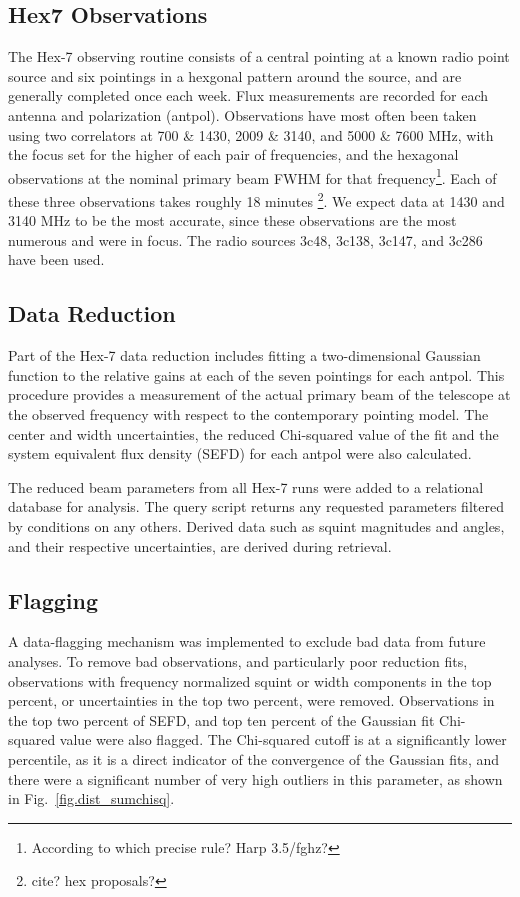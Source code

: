 \documentclass[preprint]{aastex}
\begin{document}
\subsection{Hex7 Observations}\label{ss.observations}
The Hex-7 observing routine consists of a central pointing at a known
radio point source and six pointings in a hexgonal pattern around the
source, and are generally completed once each week.  Flux measurements
are recorded for each antenna and polarization (antpol). Observations
have most often been taken using two correlators at 700 \& 1430, 2009
\& 3140, and 5000 \& 7600 MHz, with the focus set for the higher of
each pair of frequencies, and the hexagonal observations at the
nominal primary beam FWHM for that frequency\footnote{According to
  which precise rule?  Harp 3.5/fghz?}.  Each of these three
observations takes roughly 18 minutes \footnote{cite? hex
  proposals?}. We expect data at 1430 and 3140 MHz to be the most
accurate, since these observations are the most numerous and were in
focus. The radio sources 3c48, 3c138, 3c147, and 3c286 have been used.

\subsection{Data Reduction}\label{ss.reduction}
Part of the Hex-7 data reduction includes fitting a two-dimensional
Gaussian function to the relative gains at each of the seven pointings
for each antpol.  This procedure provides a measurement of the actual
primary beam of the telescope at the observed frequency with respect
to the contemporary pointing model.  The center and width
uncertainties, the reduced Chi-squared value of the fit and the system
equivalent flux density (SEFD) for each antpol were also calculated.

The reduced beam parameters from all Hex-7 runs were added to a
relational database for analysis.  The query script returns any
requested parameters filtered by conditions on any others.  Derived
data such as squint magnitudes and angles, and their respective
uncertainties, are derived during retrieval.

\subsection{Flagging}\label{ss.flagging}
A data-flagging mechanism was implemented to exclude bad data from
future analyses.  To remove bad observations, and particularly poor
reduction fits, observations with frequency normalized squint or width
components in the top percent, or uncertainties in the top two
percent, were removed.  Observations in the top two percent of SEFD,
and top ten percent of the Gaussian fit Chi-squared value were also
flagged.  The Chi-squared cutoff is at a significantly lower
percentile, as it is a direct indicator of the convergence of the
Gaussian fits, and there were a significant number of very high
outliers in this parameter, as shown in Fig.~\ref{fig.dist_sumchisq}.
\end{document}

